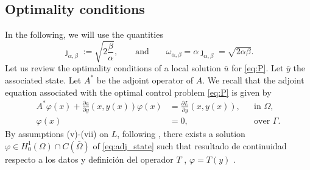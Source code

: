 \documentclass[11pt,a4paper]{amsart}
\newcommand{\om}{\Omega}
\begin{document}

\subsection{Optimality conditions} In the following, we will use the quantities
$$ \jmath_{\alpha,\beta} := \sqrt{2\dfrac{\beta}{\alpha}}, \qquad \text{and} \qquad \omega_{\alpha,\beta} =\alpha \jmath_{\alpha,\beta} =\sqrt{2\alpha \beta}.  $$
Let us review the optimality conditions of a local solution $\bar u$ for \eqref{eq:P}. Let $\bar y$ the associated state. Let $A^*$ be the adjoint operator of $A$. We recall that the adjoint equation associated with the optimal control problem \eqref{eq:P} is given by
\begin{equation}\label{eq:adj_state}
\begin{aligned}
    A^*\varphi(x) + \frac{\partial a}{\partial y}(x, y(x))\varphi(x) &= \frac{\partial L}{\partial y}(x,y(x)), &&\text{in } \Omega, 
    \\    \varphi(x) &= 0, &&\text{over } \Gamma.
\end{aligned}
\end{equation}
By assumptions (v)-(vii) on $L$, following  \cite{casas94, casw}, there exists a solution $\varphi\in H_0^1(\om)\cap C(\bar\om)$ of \eqref{eq:adj_state} such that {\color{red} resultado de continuidad respecto a los datos y definición del operador $T$ , $\varphi=T(y)$  }.
\end{document}
